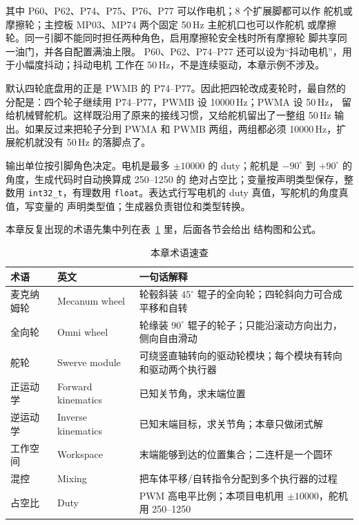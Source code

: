 其中 P60、P62、P74、P75、P76、P77 可以作电机；8 个扩展脚都可以作
舵机或摩擦轮；主控板 MP03、MP74 两个固定 50\,Hz 主舵机口也可以作舵机
或摩擦轮。同一引脚不能同时担任两种角色，启用摩擦轮安全栈时所有摩擦轮
脚共享同一油门，并各自配置满油上限。
P60、P62、P74--P77 还可以设为“抖动电机”，用于小幅度抖动；抖动电机
工作在 50\,Hz，不是连续驱动，本章示例不涉及。

\begin{remark}
默认四轮底盘用的正是 PWMB 的 P74--P77。因此把四轮改成麦轮时，最自然的
分配是：四个轮子继续用 P74--P77，PWMB 设 10000\,Hz；PWMA 设 50\,Hz，
留给机械臂舵机。这样既沿用了原来的接线习惯，又给舵机留出了一整组
50\,Hz 输出。如果反过来把轮子分到 PWMA 和 PWMB 两组，两组都必须
10000\,Hz，扩展舵机就没有 50\,Hz 的落脚点了。
\end{remark}

输出单位按引脚角色决定。电机是最多 $\pm10000$ 的 duty；舵机是
$-90^\circ$ 到 $+90^\circ$ 的角度，生成代码时自动换算成 250--1250 的
绝对占空比；变量按声明类型保存，整数用 \texttt{int32\_t}，有理数用
\texttt{float}。表达式行写电机的 duty 真值，写舵机的角度真值，写变量的
声明类型值；生成器负责钳位和类型转换。

本章反复出现的术语先集中列在表~\ref{tab:ch05-terms} 里，后面各节会给出
结构图和公式。

\begin{table}[htbp]
  \centering
  \small
  \begin{tabularx}{\linewidth}{@{}l l >{\raggedright\arraybackslash}X@{}}
    \toprule
    术语 & 英文 & 一句话解释 \\
    \midrule
    麦克纳姆轮 & Mecanum wheel & 轮毂斜装 $45^\circ$ 辊子的全向轮；四轮斜向力可合成平移和自转 \\
    全向轮 & Omni wheel & 轮缘装 $90^\circ$ 辊子的轮子；只能沿滚动方向出力，侧向自由滑动 \\
    舵轮 & Swerve module & 可绕竖直轴转向的驱动轮模块；每个模块有转向和驱动两个执行器 \\
    正运动学 & Forward kinematics & 已知关节角，求末端位置 \\
    逆运动学 & Inverse kinematics & 已知末端目标，求关节角；本章只做闭式解 \\
    工作空间 & Workspace & 末端能够到达的位置集合；二连杆是一个圆环 \\
    混控 & Mixing & 把车体平移/自转指令分配到多个执行器的过程 \\
    占空比 & Duty & PWM 高电平比例；本项目电机用 $\pm10000$，舵机用 250--1250 \\
    \bottomrule
  \end{tabularx}
  \caption{本章术语速查}
  \label{tab:ch05-terms}
\end{table}

